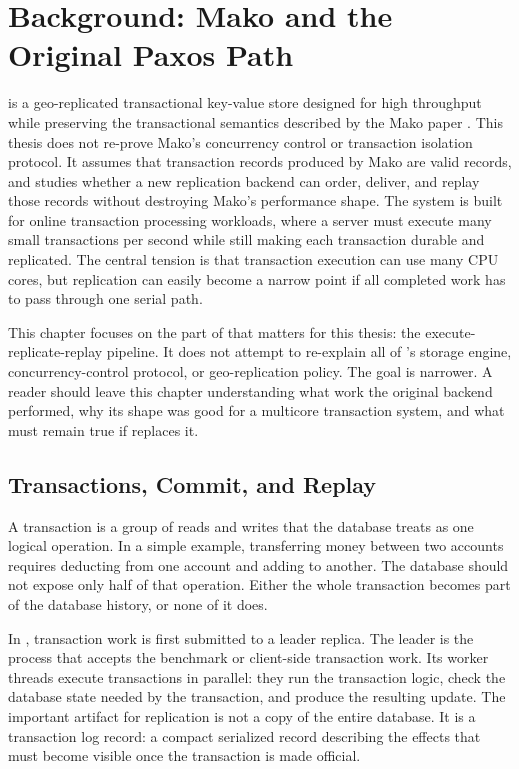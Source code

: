 \chapter{Background: Mako and the Original Paxos Path}

\Mako{} is a geo-replicated transactional key-value store designed for high
throughput while preserving the transactional semantics described by the Mako
paper \cite{mako-osdi25}. This thesis does not re-prove Mako's concurrency
control or transaction isolation protocol. It assumes that transaction records
produced by Mako are valid records, and studies whether a new replication
backend can order, deliver, and replay those records without destroying Mako's
performance shape. The system is built for online transaction processing
workloads, where a server must execute many small transactions per second while
still making each transaction durable and replicated. The central tension is
that transaction execution can use many CPU cores, but replication can easily
become a narrow point if all completed work has to pass through one serial
path.

This chapter focuses on the part of \Mako{} that matters for this thesis: the
execute-replicate-replay pipeline. It does not attempt to re-explain all of
\Mako{}'s storage engine, concurrency-control protocol, or geo-replication
policy. The goal is narrower. A reader should leave this chapter understanding
what work the original \Paxos{} backend performed, why its shape was good for a
multicore transaction system, and what must remain true if \Raft{} replaces it.

\section{Transactions, Commit, and Replay}

A transaction is a group of reads and writes that the database treats as one
logical operation. In a simple example, transferring money between two accounts
requires deducting from one account and adding to another. The database should
not expose only half of that operation. Either the whole transaction becomes
part of the database history, or none of it does.

In \Mako{}, transaction work is first submitted to a leader replica. The leader
is the process that accepts the benchmark or client-side transaction work. Its
worker threads execute transactions in parallel: they run the transaction
logic, check the database state needed by the transaction, and produce the
resulting update. The important artifact for replication is not a copy of the
entire database. It is a transaction log record: a compact serialized record
describing the effects that must become visible once the transaction is made
official.

